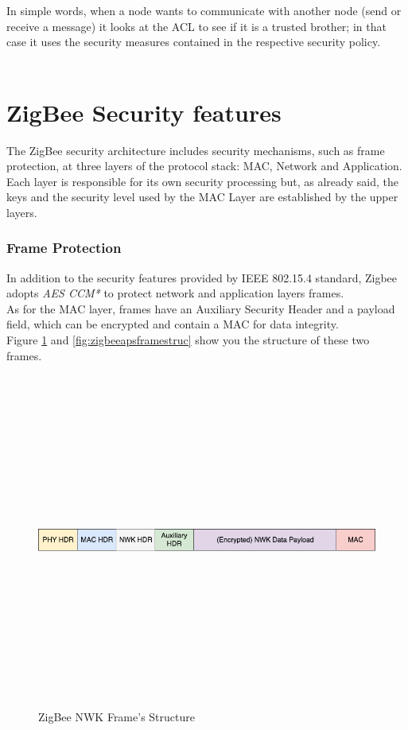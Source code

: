 \documentclass[12pt]{report}
\begin{document}
In simple words, when a node wants to communicate with another node (send or receive a message) it looks at the ACL to see if it is a trusted brother; in that case it uses the security measures contained in the respective security policy.\\\\

\section{ZigBee Security features}
\label{sec:zigbeesecfeatures}
\bigskip
The ZigBee security architecture includes security mechanisms, such as frame protection, at three layers of the protocol stack: MAC, Network and Application.\\
Each layer is responsible for its own security processing but, as already said, the keys and the security level used by the MAC Layer are established by the upper layers.

\subsubsection{Frame Protection}
\bigskip
In addition to the security features provided by IEEE 802.15.4 standard, Zigbee adopts \emph{AES CCM*} to protect network and application layers frames.\\
As for the MAC layer, frames have an Auxiliary Security Header and a payload field, which can be encrypted and contain a MAC for data integrity.\\
Figure \ref{fig:zigbeenwkframestruc} and \ref{fig:zigbeeapsframestruc} show you the structure of these two frames.\\

\begin{figure}[H]
\includegraphics[width=13cm,height=11cm,keepaspectratio]{nwk_frame}
\centering
\caption{ZigBee NWK Frame's Structure}
\label{fig:zigbeenwkframestruc}
\end{figure}
\end{document}
